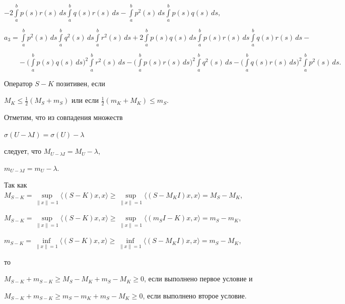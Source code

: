 $-2\int\limits_a^b p(s)r(s)\,ds\int\limits_a^b q(s)r(s)\,ds -


\int\limits_a^bp^2(s)\,ds\int\limits_a^bp(s)q(s)\,ds,$





\noindent$a_3 = \int\limits_a^bp^2(s)\,ds\int\limits_a^bq^2(s)\,ds


\int\limits_a^br^2(s)\,ds +


2\int\limits_a^bp(s)q(s)\,ds


\int\limits_a^bp(s)r(s)\,ds\int\limits_a^bq(s)r(s)\,ds -$





\noindent$\qquad- \Big(\int\limits_a^bp(s)q(s)\,ds\Big)^2


\int\limits_a^br^2(s)\,ds


- \Big(\int\limits_a^bp(s)r(s)\,ds\Big)^2\int\limits_a^bq^2(s)\,ds


- \Big(\int\limits_a^bq(s)r(s)\,ds\Big)^2\int\limits_a^bp^2(s)\,ds.$





\begin{thm}


Оператор $S-K$ позитивен, если


$M_K\le\frac12(M_S+m_S)$ или если $\frac12(m_K+M_K)\le m_S$.


\end{thm}





\begin{pf}


Отметим, что из совпадения множеств


$\sigma(U-\lambda I)=\sigma(U)-\lambda$


следует, что $M_{U-\lambda I}=M_U-\lambda$,


$m_{U-\lambda I}=m_U-\lambda$.


Так как $M_{S-K}=\sup\limits_{\|x\|=1}\langle(S-K)x,x\rangle\ge


\sup\limits_{\|x\|=1}\langle(S-M_KI)x,x\rangle=M_S-M_K$,


$M_{S-K}=\sup\limits_{\|x\|=1}\langle(S-K)x,x\rangle\ge


\sup\limits_{\|x\|=1}\langle(m_SI-K)x,x\rangle=m_S-m_K$,


$m_{S-K}=\inf\limits_{\|x\|=1}\langle(S-K)x,x\rangle\ge


\inf\limits_{\|x\|=1}\langle(S-M_KI)x,x\rangle=m_S-M_K$,


то


$M_{S-K}+m_{S-K}\ge M_S-M_K+m_S-M_K\ge0$, если выполнено первое условие и


$M_{S-K}+m_{S-K}\ge m_S-m_K+m_S-M_K\ge0$, если выполнено второе условие.


\end{pf}





